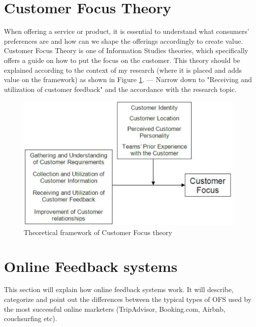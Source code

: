 \section{Customer Focus Theory}
\label{sec:CFTH}

When offering a service or product, it is essential to understand what consumers' preferences are and how can we shape the offerings accordingly to create value. Customer Focus Theory is one of Information Studies theories, which specifically offers a guide on how to put the focus on the customer. This theory should be explained according to the context of my research (where it is placed and adds value on the framework) as shown in Figure \ref{fig:CustomerFocus}. 
--- Narrow down to "Receiving and utilization of customer feedback" and the accordance with the research topic.

\label{sec:OFS}
\begin{figure}[h!]
	\centering
	\includegraphics[height=0.3\textheight]{fig01/CustomerFocus}
	\caption{Theoretical framework of Customer Focus theory}
	\label{fig:CustomerFocus}
\end{figure}

\section{Online Feedback systems}

This section will explain how online feedback systems work. It will describe, categorize and point out the differences between the typical types of OFS used by the most successful online marketers (TripAdvisor, Booking.com, Airbnb, couchsurfing etc). 